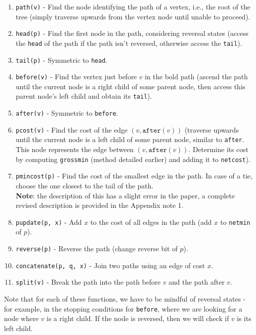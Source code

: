 \documentclass[a4paper, 11pt]{article}
\begin{document}
\begin{enumerate}
    \item \texttt{path(v)} - Find the node identifying the path of a vertex, i.e., the root of the tree (simply traverse upwards from the vertex node until unable to proceed).
    \item \texttt{head(p)} - Find the first node in the path, considering reversal states (access the \texttt{head} of the path if the path isn’t reversed, otherwise access the \texttt{tail}).
    \item \texttt{tail(p)} - Symmetric to \texttt{head}.
    \item \texttt{before(v)} - Find the vertex just before \(v\) in the bold path (ascend the path until the current node is a right child of some parent node, then access this parent node's left child and obtain its \texttt{tail}).
    \item \texttt{after(v)} - Symmetric to \texttt{before}.
    \item \texttt{pcost(v)} - Find the cost of the edge \((v, \texttt{after}(v))\) (traverse upwards until the current node is a left child of some parent node, similar to \texttt{after}. This node represents the edge between \((v, \texttt{after}(v))\). Determine its cost by computing \texttt{grossmin} (method detailed earlier) and adding it to \texttt{netcost}).
    \item \texttt{pmincost(p)} - Find the cost of the smallest edge in the path. In case of a tie, choose the one closest to the tail of the path. \\ \textbf{Note}: the description of this has a slight error in the paper, a complete revised description is provided in the Appendix note 1.
    \item \texttt{pupdate(p, x)} - Add \(x\) to the cost of all edges in the path (add \(x\) to \texttt{netmin} of \(p\)).
    \item \texttt{reverse(p)} - Reverse the path (change reverse bit of \(p\)).
    \item \texttt{concatenate(p, q, x)} - Join two paths using an edge of cost \(x\).
    \item \texttt{split(v)} - Break the path into the path before \(v\) and the path after \(v\).
\end{enumerate}

Note that for each of these functions, we have to be mindful of reversal states - for example, in the stopping conditions for \texttt{before}, where we are looking for a node where \(v\) is a right child. If the node is reversed, then we will check if \(v\) is its left child.
\end{document}
